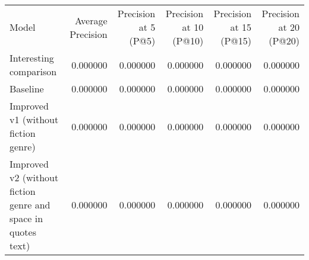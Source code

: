 \begin{tabular}{lrrrrr}
Model & Average Precision & Precision at 5 (P@5) & Precision at 10 (P@10) & Precision at 15 (P@15) & Precision at 20 (P@20) \\
Interesting comparison & 0.000000 & 0.000000 & 0.000000 & 0.000000 & 0.000000 \\
Baseline & 0.000000 & 0.000000 & 0.000000 & 0.000000 & 0.000000 \\
Improved v1 (without fiction genre) & 0.000000 & 0.000000 & 0.000000 & 0.000000 & 0.000000 \\
Improved v2 (without fiction genre and space in quotes text) & 0.000000 & 0.000000 & 0.000000 & 0.000000 & 0.000000 \\
\end{tabular}
